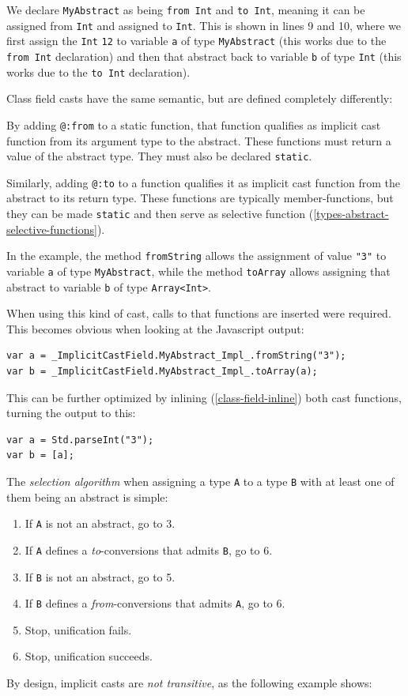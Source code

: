 \documentclass[a4paper,oneside]{book}
\newcommand{\target}[1]{#1}
\newcommand{\type}[1]{\texttt{#1}}
\newcommand{\expr}[1]{\texttt{#1}}
\newcommand{\tref}[2]{#1 (\ref{#2})}
\newcommand{\haxe}[2][]{%
}
\begin{document}
\haxe{assets/ImplicitCastDirect.hx}
We declare \type{MyAbstract} as being \expr{from Int} and \expr{to Int}, meaning it can be assigned from \type{Int} and assigned to \type{Int}. This is shown in lines 9 and 10, where we first assign the \type{Int} \expr{12} to variable \expr{a} of type \type{MyAbstract} (this works due to the \expr{from Int} declaration) and then that abstract back to variable \expr{b} of type \type{Int} (this works due to the \expr{to Int} declaration).

Class field casts have the same semantic, but are defined completely differently:

\haxe{assets/ImplicitCastField.hx}
By adding \expr{@:from} to a static function, that function qualifies as implicit cast function from its argument type to the abstract. These functions must return a value of the abstract type. They must also be declared \expr{static}.

Similarly, adding \expr{@:to} to a function qualifies it as implicit cast function from the abstract to its return type. These functions are typically member-functions, but they can be made \expr{static} and then serve as \tref{selective function}{types-abstract-selective-functions}.

In the example, the method \expr{fromString} allows the assignment of value \expr{"3"} to variable \expr{a} of type \type{MyAbstract}, while the method \expr{toArray} allows assigning that abstract to variable \expr{b} of type \type{Array<Int>}.

When using this kind of cast, calls to that functions are inserted were required. This becomes obvious when looking at the \target{Javascript} output:

\begin{lstlisting}
var a = _ImplicitCastField.MyAbstract_Impl_.fromString("3");
var b = _ImplicitCastField.MyAbstract_Impl_.toArray(a);
\end{lstlisting}
This can be further optimized by \tref{inlining}{class-field-inline} both cast functions, turning the output to this:

\begin{lstlisting}
var a = Std.parseInt("3");
var b = [a];
\end{lstlisting}
The \emph{selection algorithm} when assigning a type \expr{A} to a type \expr{B} with at least one of them being an abstract is simple:

\begin{enumerate}
	\item If \expr{A} is not an abstract, go to 3.
	\item If \expr{A} defines a \emph{to}-conversions that admits \expr{B}, go to 6.
	\item If \expr{B} is not an abstract, go to 5.
	\item If \expr{B} defines a \emph{from}-conversions that admits \expr{A}, go to 6.
	\item Stop, unification fails.
	\item Stop, unification succeeds.
\end{enumerate}
By design, implicit casts are \emph{not transitive}, as the following example shows:
\end{document}
